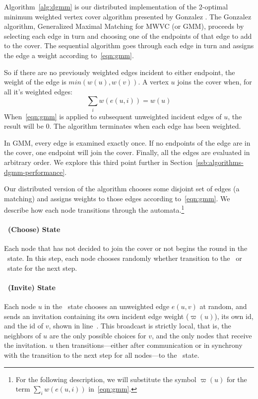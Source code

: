\label{sec:dgmm-description}

Algorithm~\ref{alg:dgmm} is our distributed implementation of the 2-optimal minimum weighted vertex cover algorithm presented by Gonzalez \cite{Gonzalez1995129}. The Gonzalez algorithm, Generalized Maximal Matching for MWVC (or GMM), proceeds by selecting each edge in turn and choosing one of the endpoints of that edge to add to the cover. The sequential algorithm goes through each edge in turn and assigns the edge a weight according to~\eqref{eqn:gmm}.



So if there are no previously weighted edges incident to either endpoint, the weight of the edge is $min(w(u),w(v))$. A vertex $u$ joins the cover when, for all it's weighted edges: \begin{equation}\sum_i w(e(u,i)) = w(u) \label{eqn:sat} \end{equation} When~\eqref{eqn:gmm} is applied to subsequent unweighted incident edges of $u$, the result will be 0. The algorithm terminates when each edge has been weighted. 

In GMM, every edge is examined exactly once. If no endpoints of the edge are in the cover, one endpoint will join the cover. Finally, all the edges are evaluated in arbitrary order. We explore this third point further in Section~\ref{ssb:algorithms-dgmm-performance}. 

Our distributed version of the algorithm chooses some disjoint set of edges (a matching) and assigns weights to those edges according to~\eqref{eqn:gmm}. We describe how each node transitions through the automata.\footnote{For the following description, we will substitute the symbol $\varpi(u)$ for the term $\sum_i w(e(u,i))$ in~\eqref{eqn:gmm}.\label{fn:varpi}}

\paragraph{\cCd\ (Choose) State} 
Each node that has not decided to join the cover or not begins the round in the \cCd\ state. In this step, each node chooses randomly whether transition to the \cId\ or \cLd\ state for the next step. 

\paragraph{\cId\ (Invite) State}
Each node $u$ in the \cId\ state chooses an unweighted edge $e(u,v)$ at random, and sends an invitation containing its own incident edge weight ($\varpi(u)$)\footnotemark[\value{footnote}], its own id, and the id of $v$, shown in line~. This broadcast is strictly local, that is, the neighbors of $u$ are the only possible choices for $v$, and the only nodes that receive the invitation. $u$ then transitions---either after communication or in synchrony with the transition to the next step for all nodes---to the \cWd\ state. 

